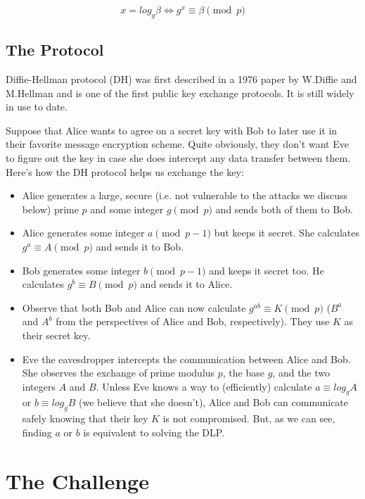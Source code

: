 \documentclass{article}
\begin{document}
$$x = log_g \beta \iff g^x \equiv \beta \pmod{p}$$

\subsection{The Protocol}

Diffie-Hellman protocol (DH) was first described in a 1976 paper by W.Diffie and M.Hellman \autocite{DiffieHellman1976} and is one of the first public key exchange protocols. It is still widely in use to date.

Suppose that Alice wants to agree on a secret key with Bob to later use it in their favorite message encryption scheme. Quite obviously, they don't want Eve to figure out the key in case she does intercept any data transfer between them. Here's how the DH protocol helps us exchange the key:

\begin{itemize}

  \item Alice generates a large, secure (i.e. not vulnerable to the attacks we discuss below) prime $p$ and some integer $g \pmod{p}$ and sends both of them to Bob.

  \item Alice generates some integer $a \pmod{p-1}$ but keeps it secret. She calculates $g^a \equiv A \pmod{p}$ and sends it to Bob.

  \item Bob generates some integer $b \pmod{p-1}$ and keeps it secret too. He calculates $g^b \equiv B \pmod{p}$ and sends it to Alice.

  \item Observe that both Bob and Alice can now calculate $g^{ab} \equiv K \pmod{p}$ ($B^a$ and $A^b$ from the perspectives of Alice and Bob, respectively). They use $K$ as their secret key.

  \item Eve the eavesdropper intercepts the communication between Alice and Bob. She observes the exchange of prime modulus $p$, the base $g$, and the two integers $A$ and $B$. Unless Eve knows a way to (efficiently) calculate $a \equiv log_g A$ or $b \equiv log_g B$ (we believe that she doesn't), Alice and Bob can communicate safely knowing that their key $K$ is not compromised. But, as we can see, finding $a$ or $b$ is equivalent to solving the DLP.

\end{itemize}

\section{The Challenge}
\end{document}

